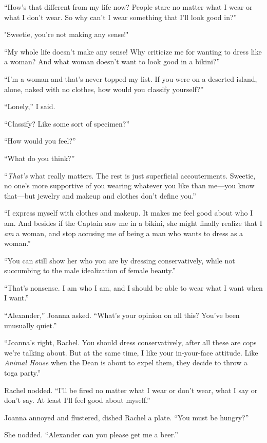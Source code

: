 ``How's that different from my life now? People stare no matter what I
wear or what I don't wear. So why can't I wear something that I'll look
good in?''

"Sweetie, you're not making any sense!"

``My whole life doesn't make any sense! Why criticize me for wanting to
dress like a woman? And what woman doesn't want to look good in a
bikini?''

``I'm a woman and that's never topped my list. If you were on a deserted
island, alone, naked with no clothes, how would you classify yourself?''

``Lonely,'' I said.

``Classify? Like some sort of specimen?''

``How would you feel?''

``What do you think?''

``\emph{That's} what really matters. The rest is just superficial
accouterments. Sweetie, no one's more supportive of you wearing whatever
you like than me---you know that---but jewelry and makeup and clothes
don't define you.''

``I express myself with clothes and makeup. It makes me feel good about
who I am. And besides if the Captain saw me in a bikini, she might
finally realize that I \emph{am} a woman, and stop accusing me of being
a man who wants to dress as a woman.''

``You can still show her who you are by dressing conservatively, while
not succumbing to the male idealization of female beauty.''

``That's nonsense. I am who I am, and I should be able to wear what I
want when I want.''

``Alexander,'' Joanna asked. ``What's your opinion on all this? You've
been unusually quiet.''

``Joanna's right, Rachel. You should dress conservatively, after all
these are cops we're talking about. But at the same time, I like your
in-your-face attitude. Like \emph{Animal House} when the Dean is about
to expel them, they decide to throw a toga party.''

Rachel nodded. ``I'll be fired no matter what I wear or don't wear, what
I say or don't say. At least I'll feel good about myself.''

Joanna annoyed and flustered, dished Rachel a plate. ``You must be
hungry?''

She nodded. ``Alexander can you please get me a beer.''

